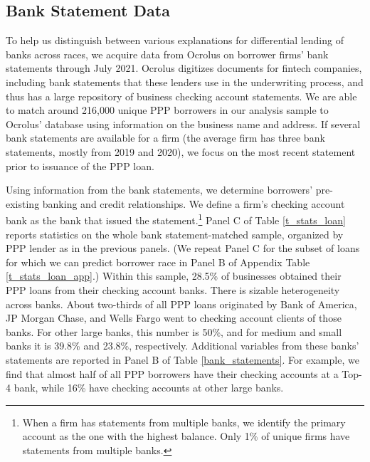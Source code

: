 \documentclass[11pt]{article}
\begin{document}
\subsection{Bank Statement Data}\label{data_bankst}

To help us distinguish between various explanations for differential lending of banks across races, we acquire data from Ocrolus on borrower firms' bank statements through July 2021. Ocrolus digitizes documents for fintech companies, including bank statements that these lenders use in the underwriting process, and thus has a large repository of business checking account statements. We are able to match around 216,000 unique PPP borrowers in our analysis sample to Ocrolus' database using information on the business name and address. If several bank statements are available for a firm (the average firm has three bank statements, mostly from 2019 and 2020), we focus on the most recent statement prior to issuance of the PPP loan.

Using information from the bank statements, we determine borrowers' pre-existing banking and credit relationships. We define a firm's checking account bank as  the bank that issued the statement.\footnote{When a firm has statements from multiple banks, we identify the primary account as the one with the highest balance. Only 1\% of unique firms have statements from multiple banks.} Panel C of Table \ref{t_stats_loan} reports statistics on the whole bank statement-matched sample, organized by PPP lender as in the previous panels. (We repeat Panel C for the subset of loans for which we can predict borrower race in Panel B of Appendix Table \ref{t_stats_loan_app}.) Within this sample, 28.5\% of businesses obtained their PPP loans from their checking account banks. There is sizable heterogeneity across banks. About two-thirds of all PPP loans originated by Bank of America, JP Morgan Chase, and Wells Fargo went to checking account clients of those banks. For other large banks, this number is 50\%, and for medium and small banks it is 39.8\% and 23.8\%, respectively. Additional variables from these banks' statements are reported in Panel B of Table \ref{bank_statements}. For example, we find that almost half of all PPP borrowers have their checking accounts at a Top-4 bank, while 16\% have checking accounts at other large banks. 
\end{document}
